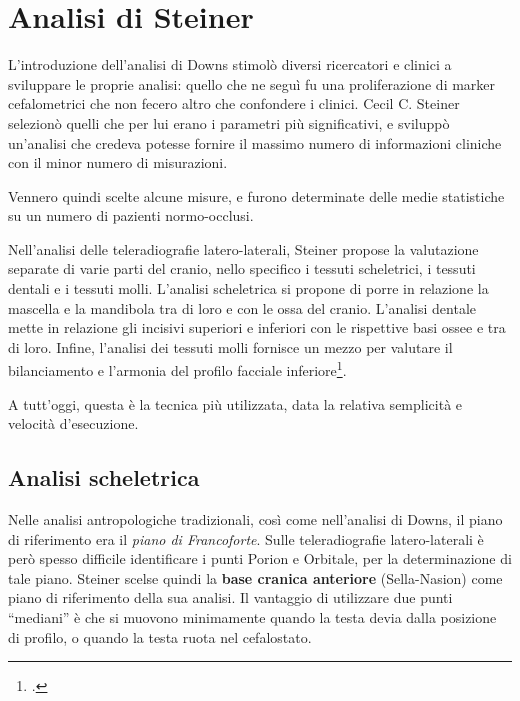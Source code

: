 \chapter{Analisi di Steiner}

L'introduzione dell'analisi di Downs stimolò diversi ricercatori e clinici a sviluppare le proprie analisi: quello che ne seguì fu una proliferazione di marker cefalometrici che non fecero altro che confondere i clinici. Cecil C. Steiner selezionò quelli che per lui erano i parametri più significativi, e sviluppò un'analisi che credeva potesse fornire il massimo numero di informazioni cliniche con il minor numero di misurazioni.

Vennero quindi scelte alcune misure, e furono determinate delle medie statistiche su un numero di pazienti normo-occlusi.

Nell'analisi delle teleradiografie latero-laterali, Steiner propose la valutazione separate di varie parti del cranio, nello specifico i tessuti scheletrici, i tessuti dentali e i tessuti molli. L'analisi scheletrica si propone di porre in relazione la mascella e la mandibola tra di loro e con le ossa del cranio. L'analisi dentale mette in relazione gli incisivi superiori e inferiori con le rispettive basi ossee e tra di loro. Infine, l'analisi dei tessuti molli fornisce un mezzo per valutare il bilanciamento e l'armonia del profilo facciale inferiore\footcite{Steiner1953,Steiner1959,Steiner1960}.

A tutt'oggi, questa è la tecnica più utilizzata, data la relativa semplicità e velocità d'esecuzione.

\section{Analisi scheletrica}
Nelle analisi antropologiche tradizionali, così come nell'analisi di Downs, il piano di riferimento era il \textit{piano di Francoforte}. Sulle teleradiografie latero-laterali è però spesso difficile identificare i punti Porion e Orbitale, per la determinazione di tale piano. Steiner scelse quindi la \textbf{base cranica anteriore} (Sella-Nasion) come piano di riferimento della sua analisi. Il vantaggio di utilizzare due punti ``mediani'' è che si muovono minimamente quando la testa devia dalla posizione di profilo, o quando la testa ruota nel cefalostato.

